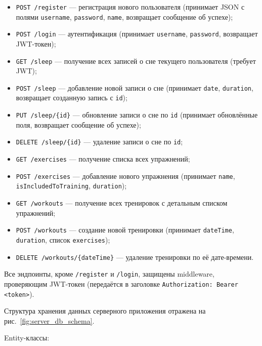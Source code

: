 \begin{itemize}
    \item \texttt{POST /register} — регистрация нового пользователя (принимает JSON с полями \texttt{username}, \texttt{password}, \texttt{name}, возвращает сообщение об успехе);
    \item \texttt{POST /login} — аутентификация (принимает \texttt{username}, \texttt{password}, возвращает JWT-токен);
    \item \texttt{GET /sleep} — получение всех записей о сне текущего пользователя (требует JWT);
    \item \texttt{POST /sleep} — добавление новой записи о сне (принимает \texttt{date}, \texttt{duration}, возвращает созданную запись с \texttt{id});
    \item \texttt{PUT /sleep/\{id\}} — обновление записи о сне по \texttt{id} (принимает обновлённые поля, возвращает сообщение об успехе);
    \item \texttt{DELETE /sleep/\{id\}} — удаление записи о сне по \texttt{id};
    \item \texttt{GET /exercises} — получение списка всех упражнений;
    \item \texttt{POST /exercises} — добавление нового упражнения (принимает \texttt{name}, \texttt{isIncludedToTraining}, \texttt{duration});
    \item \texttt{GET /workouts} — получение всех тренировок с детальным списком упражнений;
    \item \texttt{POST /workouts} — создание новой тренировки (принимает \texttt{dateTime}, \texttt{duration}, список \texttt{exercises});
    \item \texttt{DELETE /workouts/\{dateTime\}} — удаление тренировки по её дате-времени.
\end{itemize}

Все эндпоинты, кроме \texttt{/register} и \texttt{/login}, защищены middleware, проверяющим JWT-токен (передаётся в заголовке \texttt{Authorization: Bearer <token>}). 

Структура хранения данных серверного приложения отражена на рис.~\ref{fig:server_db_schema}.

Entity-классы:

